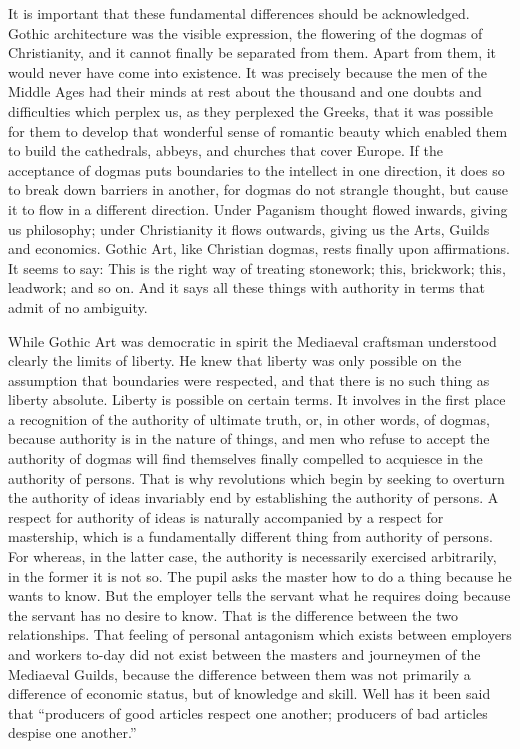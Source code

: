 \documentclass{book}
\begin{document}
It is important that these fundamental differences should be acknowledged. Gothic architecture was the visible expression, the flowering of the dogmas of Christianity, and it cannot finally be separated from them. Apart from them, it would never have come into existence. It was precisely because the men of the Middle Ages had their minds at rest about the thousand and one doubts and difficulties which perplex us, as they perplexed the Greeks, that it was possible for them to develop that wonderful sense of romantic beauty which enabled them to build the cathedrals, abbeys, and churches that cover Europe. If the acceptance of dogmas puts boundaries to the intellect in one direction, it does so to break down barriers in another, for dogmas do not strangle thought, but cause it to flow in a different direction. Under Paganism thought flowed inwards, giving us philosophy; under Christianity it flows outwards, giving us the Arts, Guilds and economics. Gothic Art, like Christian dogmas, rests finally upon affirmations. It seems to say: This is the right way of treating stonework; this, brickwork; this, leadwork; and so on. And it says all these things with authority in terms that admit of no ambiguity.

While Gothic Art was democratic in spirit the Mediaeval craftsman understood clearly the limits of liberty. He knew that liberty was only possible on the assumption that boundaries were respected, and that there is no such thing as liberty absolute. Liberty is possible on certain terms. It involves in the first place a recognition of the authority of ultimate truth, or, in other words, of dogmas, because authority is in the nature of things, and men who refuse to accept the authority of dogmas will find themselves finally compelled to acquiesce in the authority of persons. That is why revolutions which begin by seeking to overturn the authority of ideas invariably end by establishing the authority of persons. A respect for authority of ideas is naturally accompanied by a respect for mastership, which is a fundamentally different thing from authority of persons. For whereas, in the latter case, the authority is necessarily exercised arbitrarily, in the former it is not so. The pupil asks the master how to do a thing because he wants to know. But the employer tells the servant what he requires doing because the servant has no desire to know. That is the difference between the two relationships. That feeling of personal antagonism which exists between employers and workers to-day did not exist between the masters and journeymen of the Mediaeval Guilds, because the difference between them was not primarily a difference of economic status, but of knowledge and skill. Well has it been said that “producers of good articles respect one another; producers of bad articles despise one another.” \footnotemark[2]
\end{document}
